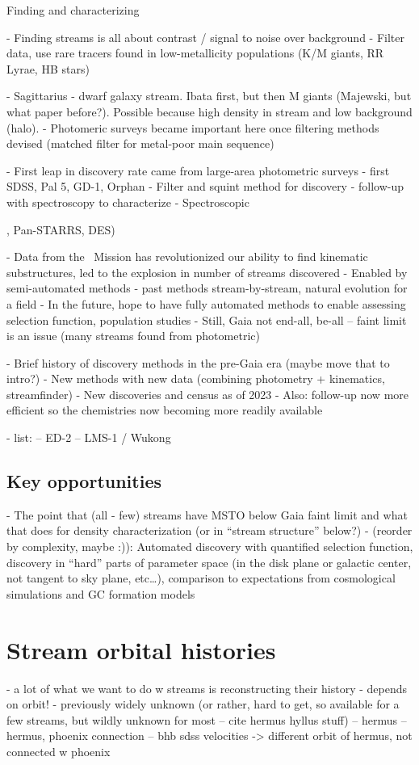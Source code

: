 \documentclass[final,5p,times,twocolumn,authoryear]{elsarticle}
\begin{document}
Finding and characterizing

- Finding streams is all about contrast / signal to noise over background
- Filter data, use rare tracers found in low-metallicity populations (K/M giants, RR Lyrae, HB stars)

- Sagittarius - dwarf galaxy stream. Ibata first, but then  M giants (Majewski, but what paper before?). Possible because high density in stream and low background (halo).
- Photomeric surveys became important here once filtering methods devised (matched filter for metal-poor main sequence)


- First leap in discovery rate came from large-area photometric surveys - first SDSS, Pal 5, GD-1, Orphan
- Filter and squint method for discovery - follow-up with spectroscopy to characterize
- Spectroscopic

, Pan-STARRS, DES)

- Data from the \gaia\ Mission has revolutionized our ability to find kinematic substructures, led to the explosion in number of streams discovered
- Enabled by semi-automated methods - past methods stream-by-stream, natural evolution for a field
- In the future, hope to have fully automated methods to enable assessing selection function, population studies
- Still, Gaia not end-all, be-all -- faint limit is an issue (many streams found from photometric)

- Brief history of discovery methods in the pre-Gaia era (maybe move that to intro?)
- New methods with new data (combining photometry + kinematics, streamfinder)
- New discoveries and census as of 2023
- Also: follow-up now more efficient so the chemistries now becoming more readily available

- list:
-- ED-2
-- LMS-1 / Wukong

\subsection{Key opportunities}
- The point that (all - few) streams have MSTO below Gaia faint limit and what that does for density characterization (or in “stream structure” below?)
- (reorder by complexity, maybe :)): Automated discovery with quantified selection function, discovery in “hard” parts of parameter space (in the disk plane or galactic center, not tangent to sky plane, etc…), comparison to expectations from cosmological simulations and GC formation models


\section{Stream orbital histories}
\label{sec:orbits}
- a lot of what we want to do w streams is reconstructing their history
- depends on orbit!
- previously widely unknown (or rather, hard to get, so available for a few streams, but wildly unknown for most -- cite hermus hyllus stuff)
-- hermus \citep{grillmair:2014}
-- hermus, phoenix connection \citep{gc:2016}
-- bhb sdss velocities -> different orbit of hermus, not connected w phoenix \citep{martin:2018}
\end{document}
